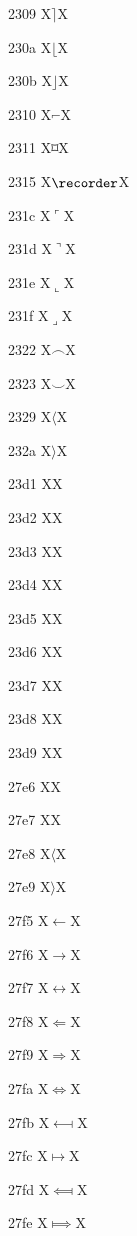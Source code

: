 \documentclass[11pt]{article}
\begin{document}
2309 X{\ensuremath{\rceil}}X

230a X{\ensuremath{\lfloor}}X

230b X{\ensuremath{\rfloor}}X

2310 X{\ensuremath{\invneg}}X

2311 X{\ensuremath{\wasylozenge}}X

2315 X{\ensuremath{\recorder}}X

231c X{\ensuremath{\ulcorner}}X

231d X{\ensuremath{\urcorner}}X

231e X{\ensuremath{\llcorner}}X

231f X{\ensuremath{\lrcorner}}X

2322 X{\ensuremath{\frown}}X

2323 X{\ensuremath{\smile}}X

2329 X{\ensuremath{\langle}}X

232a X{\ensuremath{\rangle}}X

23d1 X{\metra{\b}}X

23d2 X{\metra{\mb}}X

23d3 X{\metra{\bm}}X

23d4 X{\metra{\mbb}}X

23d5 X{\metra{\bbm}}X

23d6 X{\metra{\bb}}X

23d7 X{\metra{\tsbm}}X

23d8 X{\metra{\tsmm}}X

23d9 X{\metra{\ps}}X

27e6 X{\textlbrackdbl}X

27e7 X{\textrbrackdbl}X

27e8 X{\ensuremath{\langle}}X

27e9 X{\ensuremath{\rangle}}X

27f5 X{\ensuremath{\longleftarrow}}X

27f6 X{\ensuremath{\longrightarrow}}X

27f7 X{\ensuremath{\longleftrightarrow}}X

27f8 X{\ensuremath{\Longleftarrow}}X

27f9 X{\ensuremath{\Longrightarrow}}X

27fa X{\ensuremath{\Longleftrightarrow}}X

27fb X{\ensuremath{\longmapsfrom}}X

27fc X{\ensuremath{\longmapsto}}X

27fd X{\ensuremath{\Longmapsfrom}}X

27fe X{\ensuremath{\Longmapsto}}X
\end{document}
